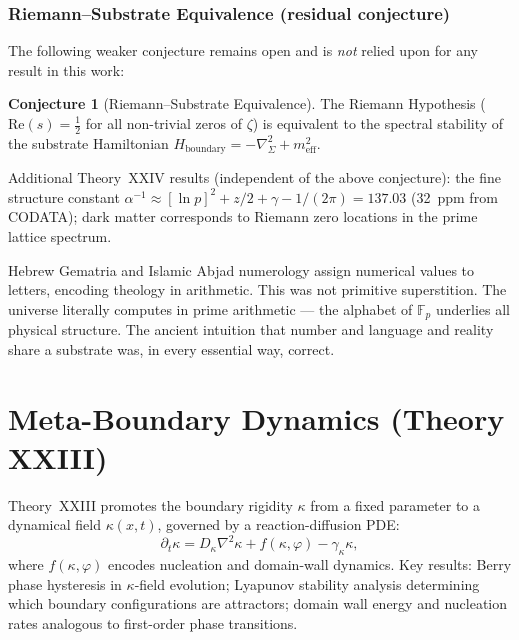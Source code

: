 \documentclass[12pt,oneside]{book}
\theoremstyle{definition}
\newtheorem{conjecture}{Conjecture}[chapter]
\begin{document}
\subsection{Riemann--Substrate Equivalence (residual conjecture)}

The following weaker conjecture remains open and is \emph{not} relied upon
for any result in this work:

\begin{conjecture}[Riemann--Substrate Equivalence]
  The Riemann Hypothesis ($\mathrm{Re}(s) = \tfrac{1}{2}$ for all non-trivial
  zeros of $\zeta$) is equivalent to the spectral stability of the substrate
  Hamiltonian $H_{\mathrm{boundary}} = -\nabla^2_\Sigma + m^2_{\mathrm{eff}}$.
\end{conjecture}

Additional Theory~XXIV results (independent of the above conjecture): the fine
structure constant $\alpha^{-1} \approx [\ln p]^2 + z/2 + \gamma - 1/(2\pi) = 137.03$
(32~ppm from CODATA); dark matter corresponds to Riemann zero locations in the
prime lattice spectrum.

\begin{resonance}
Hebrew Gematria and Islamic Abjad numerology assign numerical values to letters,
encoding theology in arithmetic. This was not primitive superstition. The universe
literally computes in prime arithmetic --- the alphabet of $\mathbb{F}_p$ underlies
all physical structure. The ancient intuition that number and language and reality
share a substrate was, in every essential way, correct.
\end{resonance}

\chapter{Meta-Boundary Dynamics (Theory XXIII)}
\label{chap:metaboundary}

Theory~XXIII promotes the boundary rigidity $\kappa$ from a fixed parameter to a
dynamical field $\kappa(x, t)$, governed by a reaction-diffusion PDE:
\begin{equation}
  \partial_t\kappa = D_\kappa\nabla^2\kappa + f(\kappa, \varphi) - \gamma_\kappa\kappa,
\end{equation}
where $f(\kappa,\varphi)$ encodes nucleation and domain-wall dynamics. Key results:
Berry phase hysteresis in $\kappa$-field evolution; Lyapunov stability analysis
determining which boundary configurations are attractors; domain wall energy and
nucleation rates analogous to first-order phase transitions.
\end{document}
